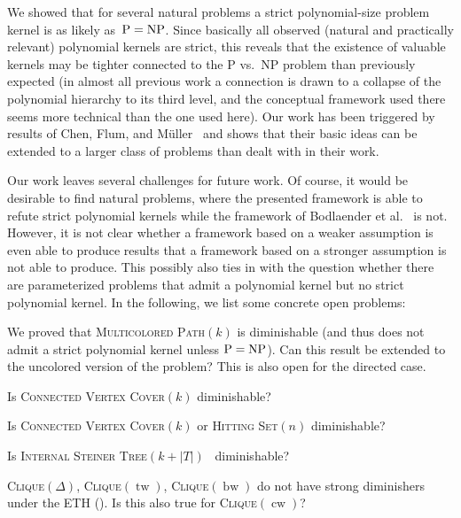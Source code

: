 \documentclass[11pt,a4,USenglish]{article}
\newcommand{\prob}[1]{\textsc{#1}}
\newcommand{\pprob}[2]{\prob{#1}$(#2)$}
\newcommand{\NP}{\textnormal{NP}}
\newcommand{\PTIME}{\textnormal{P}}
\newcommand{\PeqNP}{$\PTIME{}=\NP{}$}
\newcommand{\ETH}{\textnormal{ETH}}
\DeclareMathOperator{\tw}{tw}
\DeclareMathOperator{\bw}{bw}
\DeclareMathOperator{\cw}{cw}
\theoremstyle{definition}
\theoremstyle{plain}
\theoremstyle{remark}
\begin{document}
We showed that for several natural problems a %
%
strict polynomial-size problem
kernel is as likely as~\PeqNP{}. 
%
Since basically all observed 
(natural and practically relevant) polynomial kernels are 
%
strict, this reveals 
that the existence of valuable kernels may be tighter connected to 
the P vs.\ NP problem than previously 
expected (in almost all previous work a 
connection is drawn to a collapse of the 
polynomial hierarchy to its third level, and the conceptual framework used
there seems more technical than the one used here).
Our work has been triggered by results of 
Chen, Flum, and M\"uller~\cite{chen2011lower} and shows %
%
that their basic ideas 
can be extended to a larger class of problems than dealt with 
in their work.


Our work leaves several challenges for future work.
Of course, it would be desirable to find natural problems, where the presented framework is able to refute strict polynomial kernels while the framework of Bodlaender et al.~\cite{BodlaenderDFH09} is not. 
However, it is not clear whether a framework based on a weaker assumption is even able to produce results that a framework based on a stronger assumption is not able to produce. 
This possibly also ties in with the question whether there are parameterized problems that admit a polynomial kernel but no strict polynomial kernel. 
In the following, we list some concrete open problems:
%
\begin{compactitem}
\item We proved that \pprob{Multicolored Path}{k} is diminishable (and thus 
does not admit a strict polynomial kernel unless \PeqNP{}). Can this
result be extended to the uncolored version of the problem?
This is also open for the directed case.
\iflong{}
  \item Is \pprob{Connected Vertex Cover}{k} diminishable?
%
\else{}
  \item Is \pprob{Connected Vertex Cover}{k} or \pprob{Hitting Set}{n}
  diminishable?%
\fi{}
  \item Is \pprob{Internal Steiner Tree}{k+|T|}~\cite{HuangLGH13} diminishable? 
  \item \pprob{Clique}{\Delta}, \pprob{Clique}{\tw}, 
\pprob{Clique}{\bw} do not have strong diminishers under the \ETH{} (). 
Is this also true for \pprob{Clique}{\cw}? 
\end{compactitem}
%








\end{document}
